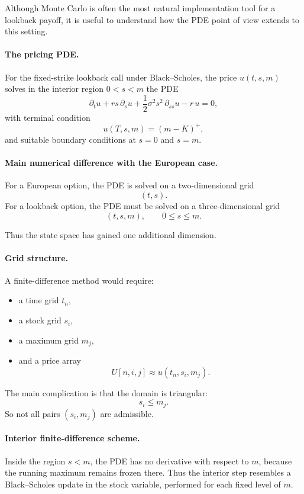 \documentclass[11pt]{article}
\theoremstyle{plain}
\theoremstyle{definition}
\theoremstyle{remark}
\begin{document}
Although Monte Carlo is often the most natural implementation tool for a
lookback payoff, it is useful to understand how the PDE point of view
extends to this setting.

\paragraph{The pricing PDE.}
For the fixed-strike lookback call under Black--Scholes, the price
\(u(t,s,m)\) solves in the interior region \(0<s<m\) the PDE
\[
\partial_t u
+
rs\,\partial_s u
+
\frac12 \sigma^2 s^2\,\partial_{ss}u
-r\,u
=
0,
\]
with terminal condition
\[
u(T,s,m)=(m-K)^+,
\]
and suitable boundary conditions at \(s=0\) and \(s=m\).

\paragraph{Main numerical difference with the European case.}
For a European option, the PDE is solved on a two-dimensional grid
\[
(t,s).
\]
For a lookback option, the PDE must be solved on a three-dimensional
grid
\[
(t,s,m),
\qquad 0\le s\le m.
\]

Thus the state space has gained one additional dimension.

\paragraph{Grid structure.}
A finite-difference method would require:
\begin{itemize}[leftmargin=1.4em]
    \item a time grid \(t_n\),
    \item a stock grid \(s_i\),
    \item a maximum grid \(m_j\),
    \item and a price array
    \[
    U[n,i,j]\approx u(t_n,s_i,m_j).
    \]
\end{itemize}

The main complication is that the domain is triangular:
\[
s_i\le m_j.
\]
So not all pairs \((s_i,m_j)\) are admissible.

\paragraph{Interior finite-difference scheme.}
Inside the region \(s<m\), the PDE has no derivative with respect to
\(m\), because the running maximum remains frozen there.
Thus the interior step resembles a Black--Scholes update in the stock
variable, performed for each fixed level of \(m\).
\end{document}
